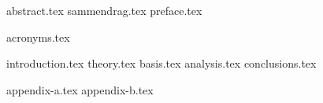\documentclass[10pt,twoside,openright,final]{report}
\begin{document}
\raggedbottom
{}
\setcounter{page}{1}
{abstract.tex}
{sammendrag.tex}
{preface.tex}
\listoftodos %
{\hypersetup{linkcolor=black}
	\tableofcontents
	\begingroup
		\let\clearpage\relax
		\makeatletter
		\@openrightfalse
		\makeatother
		\listoffigures
		\listoftables
		\listofalgorithms
		\lstlistoflistings
		\newpage
		{acronyms.tex}
	\endgroup
}
\clearpage
\cleardoublepage
\setcounter{page}{0}
{introduction.tex}
{theory.tex}
{basis.tex}
{analysis.tex}
{conclusions.tex}
%
% 
\printbibliography
\appendix
{appendix-a.tex}
{appendix-b.tex}
\end{document}
